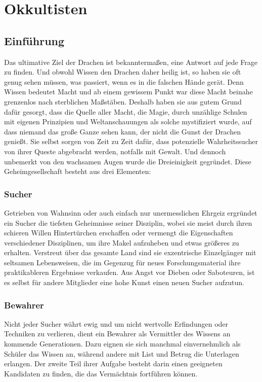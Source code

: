 \documentclass[a4paper,12pt,oneside]{book}
\begin{document}
\chapter{Okkultisten}
\section{Einführung}
Das ultimative Ziel der Drachen ist bekanntermaßen, eine Antwort auf jede Frage zu finden. Und obwohl Wissen den Drachen daher heilig ist, so haben sie oft genug sehen müssen, was passiert, wenn es in die falschen Hände gerät. Denn Wissen bedeutet Macht und ab einem gewissem Punkt war diese Macht beinahe grenzenlos nach sterblichen Maßstäben. Deshalb haben sie aus gutem Grund dafür gesorgt, dass die Quelle aller Macht, die Magie, durch unzählige Schulen mit eigenen Prinzipien und Weltanschauungen als solche mystifiziert wurde, auf dass niemand das große Ganze sehen kann, der nicht die Gunst der Drachen genießt. Sie selbst sorgen von Zeit zu Zeit dafür, dass potenzielle Wahrheitssucher von ihrer Queste abgebracht werden, notfalls mit Gewalt. Und dennoch unbemerkt von den wachsamen Augen wurde die Dreieinigkeit gegründet. Diese Geheimgesellschaft besteht aus drei Elementen:
\subsection{Sucher}
Getrieben von Wahnsinn oder auch einfach nur unermesslichen Ehrgeiz ergründet ein Sucher die tiefsten Geheimnisse seiner Disziplin, wobei sie meist durch ihren schieren Willen Hintertürchen erschaffen oder vermengt die Eigenschaften verschiedener Disziplinen, um ihre Makel aufzuheben und etwas größeres zu erhalten. Verstreut über das gesamte Land sind sie exzentrische Einzelgänger mit seltsamen Lebensweisen, die im Gegenzug für neues Forschungsmaterial ihre praktikableren Ergebnisse verkaufen. Aus Angst vor Dieben oder Saboteuren, ist es selbst für andere Mitglieder eine hohe Kunst einen neuen Sucher aufzutun.
\subsection{Bewahrer}
Nicht jeder Sucher währt ewig und um nicht wertvolle Erfindungen oder Techniken zu verlieren, dient ein Bewahrer als Vermittler des Wissens an kommende Generationen. Dazu eignen sie sich manchmal einvernehmlich als Schüler das Wissen an, während andere mit List und Betrug die Unterlagen erlangen. Der zweite Teil ihrer Aufgabe besteht darin einen geeigneten Kandidaten zu finden, die das Vermächtnis fortführen können.
\end{document}
